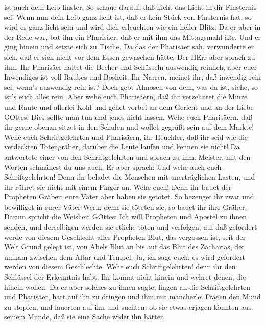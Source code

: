 ist auch dein Leib finster.  So schaue darauf, daß nicht
das Licht in dir Finsternis sei!  Wenn nun dein Leib ganz
licht ist, daß er kein Stück von Finsternis hat, so wird er ganz licht
sein und wird dich erleuchten wie ein heller Blitz.  Da er
aber in der Rede war, bat ihn ein Pharisäer, daß er mit ihm das
Mittagsmahl äße. Und er ging hinein und setzte sich zu Tische.
 Da das der Pharisäer sah, verwunderte er sich, daß er sich
nicht vor dem Essen gewaschen hätte.  Der HErr aber sprach
zu ihm: Ihr Pharisäer haltet die Becher und Schüsseln auswendig
reinlich; aber euer Inwendiges ist voll Raubes und Bosheit.
 Ihr Narren, meinet ihr, daß inwendig rein sei, wenn's
auswendig rein ist?  Doch gebt Almosen von dem, was da ist,
siehe, so ist's euch alles rein.  Aber wehe euch
Pharisäern, daß ihr verzehntet die Minze und Raute und allerlei Kohl und
gehet vorbei an dem Gericht und an der Liebe GOttes! Dies sollte man tun
und jenes nicht lassen.  Wehe euch Pharisäern, daß ihr
gerne obenan sitzet in den Schulen und wollet gegrüßt sein auf dem
Markte!  Wehe euch Schriftgelehrten und Pharisäern, ihr
Heuchler, daß ihr seid wie die verdeckten Totengräber, darüber die Leute
laufen und kennen sie nicht!  Da antwortete einer von den
Schriftgelehrten und sprach zu ihm: Meister, mit den Worten schmähest du
uns auch.  Er aber sprach: Und wehe auch euch
Schriftgelehrten! Denn ihr beladet die Menschen mit unerträglichen
Lasten, und ihr rühret sie nicht mit einem Finger an.  Wehe
euch! Denn ihr bauet der Propheten Gräber; eure Väter aber haben sie
getötet.  So bezeuget ihr zwar und bewilliget in eurer
Väter Werk; denn sie töteten sie, so bauet ihr ihre Gräber.
 Darum spricht die Weisheit GOttes: Ich will Propheten und
Apostel zu ihnen senden, und derselbigen werden sie etliche töten und
verfolgen,  auf daß gefordert werde von diesem Geschlecht
aller Propheten Blut, das vergossen ist, seit der Welt Grund gelegt ist,
 von Abels Blut an bis auf das Blut des Zacharias, der
umkam zwischen dem Altar und Tempel. Ja, ich sage euch, es wird
gefordert werden von diesem Geschlechte.  Wehe euch
Schriftgelehrten! denn ihr den Schlüssel der Erkenntnis habt. Ihr kommt
nicht hinein und wehret denen, die hinein wollen.  Da er
aber solches zu ihnen sagte, fingen an die Schriftgelehrten und
Pharisäer, hart auf ihn zu dringen und ihm mit mancherlei Fragen den
Mund zu stopfen,  und lauerten auf ihn und suchten, ob sie
etwas erjagen könnten aus seinem Munde, daß sie eine Sache wider ihn
hätten.

